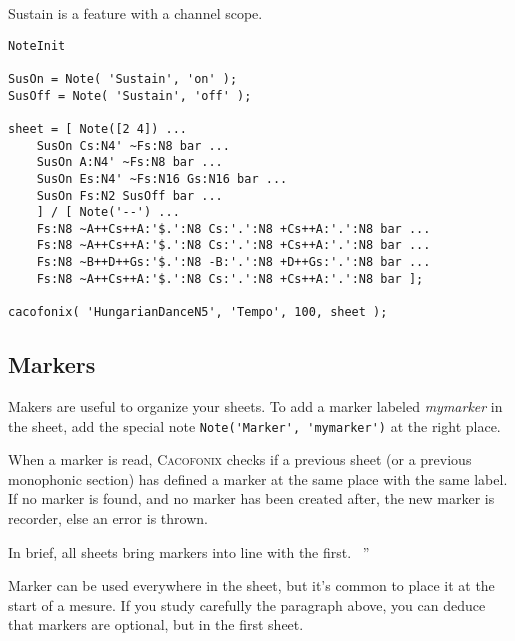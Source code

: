 \documentclass{article}
\newcommand{\cacofonix}{\textsc{Cacofonix}\xspace}
\newenvironment{meenv}{ \par \noindent \makebox[6em][r]{ \textcolor{mecolor}{Me}: `` --~}}{~''}
\newcommand{ \me }[1]{%
\begin{meenv}%
	#1%
\end{meenv} }
\begin{document}
Sustain is a feature with a channel scope.


\begin{lstlisting}
NoteInit

SusOn = Note( 'Sustain', 'on' );
SusOff = Note( 'Sustain', 'off' );

sheet = [ Note([2 4]) ...
	SusOn Cs:N4' ~Fs:N8 bar ...
	SusOn A:N4' ~Fs:N8 bar ...
	SusOn Es:N4' ~Fs:N16 Gs:N16 bar ...
	SusOn Fs:N2 SusOff bar ...
	] / [ Note('--') ...
	Fs:N8 ~A++Cs++A:'$.':N8 Cs:'.':N8 +Cs++A:'.':N8 bar ...
	Fs:N8 ~A++Cs++A:'$.':N8 Cs:'.':N8 +Cs++A:'.':N8 bar ...
	Fs:N8 ~B++D++Gs:'$.':N8 -B:'.':N8 +D++Gs:'.':N8 bar ...
	Fs:N8 ~A++Cs++A:'$.':N8 Cs:'.':N8 +Cs++A:'.':N8 bar ];

cacofonix( 'HungarianDanceN5', 'Tempo', 100, sheet );
\end{lstlisting}

\subsection{Markers}
\label{sec:Markers}

Makers are useful to organize your sheets. To add a marker labeled \emph{mymarker} in the sheet, add the special note \lstinline!Note('Marker', 'mymarker')! at the right place.

When a marker is read, \cacofonix checks if a previous sheet (or a previous monophonic section) has defined a marker at the same place with the same label. If no marker is found, and no marker has been created after, the new marker is recorder, else an error is thrown.
\me{In brief, all sheets bring markers into line with the first.}

Marker can be used everywhere in the sheet, but it's common to place it at the start of a mesure. If you study carefully the paragraph above, you can deduce that markers are optional, but in the first sheet.
\end{document}
